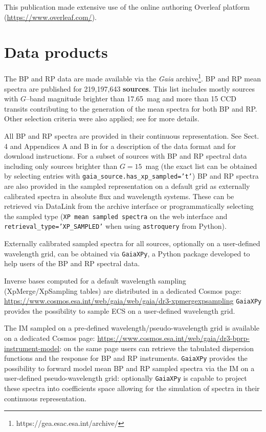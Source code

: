 \documentclass{aa}
\newcommand{\gaia}{\textit{Gaia}\xspace}
\newcommand{\gband}{$G$--band\xspace}
\newcommand{\xp}{BP and RP\xspace}
\newcommand{\gaiaxpy}{\texttt{GaiaXPy}\xspace}
\begin{document}
\begin{appendix}
This publication made extensive use of the online authoring Overleaf platform (\url{https://www.overleaf.com/}).\\

\section{Data products}\label{sec:dataProducts}

The \xp data are made available via the \gaia archive\footnote{https://gea.esac.esa.int/archive/}.
\xp mean spectra are published for 219,197,643 \textbf{sources}.
This list includes mostly sources with \gband magnitude brighter than 17.65~mag and more than 15 CCD transits contributing to the generation of the mean spectra for both \xp. Other selection criteria were also applied; see \cite{DeAngeli2022} for more details.

All \xp spectra are provided in their continuous representation. See Sect. 4 and Appendices A and B in \cite{DeAngeli2022} for a description of the data format and for download instructions.
For a subset of sources with \xp spectral data including only sources brighter than $G=15$~mag (the exact list can be obtained by selecting entries with \texttt{gaia\_source.has\_xp\_sampled='t'}) \xp spectra are also provided in the sampled representation on a default grid as externally calibrated spectra in absolute flux and wavelength systems. These can be retrieved via DataLink from the archive interface or programmatically selecting the sampled type (\texttt{XP mean sampled spectra} on the web interface and \texttt{retrieval\_type=’XP\_SAMPLED’} when using \texttt{astroquery} from Python).

Externally calibrated sampled spectra for all sources, optionally on a user-defined wavelength grid, can be obtained via \gaiaxpy \citep{DeAngeli2022b}, a Python package developed to help users of the \xp spectral data.

Inverse bases computed for a default wavelength sampling (XpMerge/XpSampling tables) are distributed in a dedicated Cosmos page:
\url{https://www.cosmos.esa.int/web/gaia/web/gaia/dr3-xpmergexpsampling}
\gaiaxpy provides the possibility to sample ECS on a user-defined wavelength grid.

The IM sampled on a pre-defined wavelength/pseudo-wavelength grid is available on a dedicated Cosmos page:
\url{https://www.cosmos.esa.int/web/gaia/dr3-bprp-instrument-model}: on the same page users can retrieve the tabulated dispersion functions and the response for BP and RP instruments.
\gaiaxpy provides the possibility to forward model mean BP and RP sampled spectra via the IM on a user-defined pseudo-wavelength grid: optionally \gaiaxpy is capable to project these spectra into coefficients space allowing for the simulation of spectra in their continuous representation.


\end{appendix}
\end{document}
